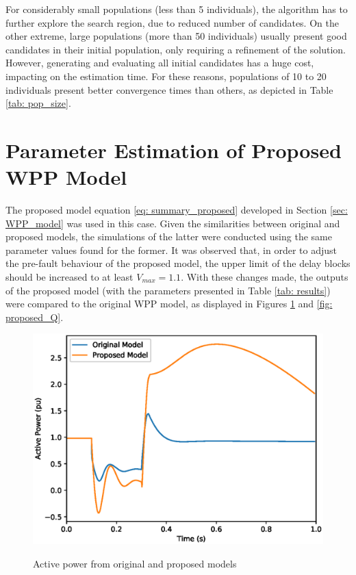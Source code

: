 For considerably small populations (less than 5 individuals), the algorithm has to further explore the search region, due to reduced number of candidates. On the other extreme, large populations (more than 50 individuals) usually present good candidates in their initial population, only requiring a refinement of the solution. However, generating and evaluating all initial candidates has a huge cost, impacting on the estimation time. For these reasons, populations of 10 to 20 individuals present better convergence times than others, as depicted in Table \ref{tab: pop_size}.

\section{Parameter Estimation of Proposed WPP Model}

The proposed model equation \eqref{eq: summary_proposed} developed in Section \ref{sec: WPP_model} was used in this case. Given the similarities between original and proposed models, the simulations of the latter were conducted using the same parameter values found for the former. It was observed that, in order to adjust the pre-fault behaviour of the proposed model, the upper limit of the delay blocks should be increased to at least $V_{max} = 1.1$. With these changes made, the outputs of the proposed model (with the parameters presented in Table \ref{tab: results}) were compared to the original WPP model, as displayed in Figures \ref{fig: proposed_P} and \ref{fig: proposed_Q}.

\begin{figure}[!h]
	\centering
	\caption{Active power from original and proposed models}
	\includegraphics[scale=.7]{Images/P_proposed.eps}
	\label{fig: proposed_P}
\end{figure}

